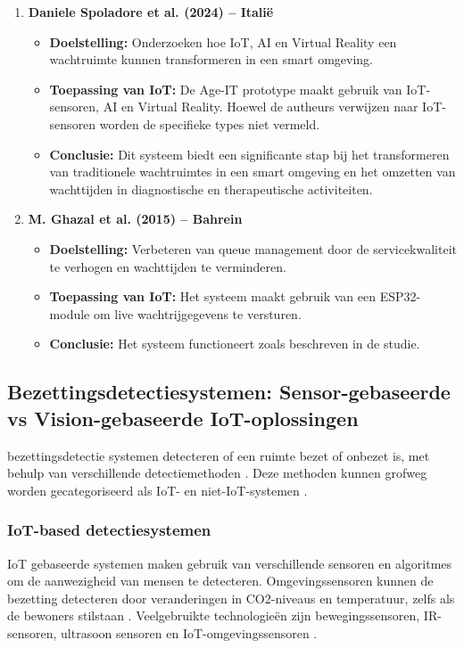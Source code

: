 {\begin{enumerate}
    \item \textbf{Daniele Spoladore et al. (2024) – Italië}
    \begin{itemize}
        \item \textbf{Doelstelling:} Onderzoeken hoe IoT, AI en Virtual Reality een wachtruimte kunnen transformeren in een smart omgeving.
        \item \textbf{Toepassing van IoT:} De Age-IT prototype maakt gebruik van IoT-sensoren, AI en Virtual Reality. Hoewel de autheurs verwijzen naar IoT-sensoren worden de specifieke types niet vermeld.
        \item \textbf{Conclusie:} Dit systeem biedt een significante stap bij het transformeren van traditionele wachtruimtes in een smart omgeving en het omzetten van wachttijden in diagnostische en therapeutische activiteiten.
    \end{itemize}
    
    \item \textbf{M. Ghazal et al. (2015) – Bahrein}
    \begin{itemize}
        \item \textbf{Doelstelling:} Verbeteren van queue management door de servicekwaliteit te verhogen en wachttijden te verminderen.
        \item \textbf{Toepassing van IoT:} Het systeem maakt gebruik van een ESP32-module om live wachtrijgegevens te versturen.
        \item \textbf{Conclusie:} Het systeem functioneert zoals beschreven in de studie.
    \end{itemize}
\end{enumerate}


\subsection{Bezettingsdetectiesystemen: Sensor-gebaseerde vs Vision-gebaseerde IoT-oplossingen}
bezettingsdetectie systemen detecteren of een ruimte bezet of onbezet is, met behulp van verschillende detectiemethoden \autocite{Kleiminger2015}. Deze methoden kunnen grofweg worden gecategoriseerd als IoT- en niet-IoT-systemen \autocite{Chaudhari2024}.

\subsubsection{IoT-based detectiesystemen}
IoT gebaseerde systemen maken gebruik van verschillende sensoren en algoritmes om de aanwezigheid van mensen te detecteren. Omgevingssensoren kunnen de bezetting detecteren door veranderingen in CO2-niveaus en temperatuur, zelfs als de bewoners stilstaan \autocite{Chand2021}. Veelgebruikte technologieën zijn bewegingssensoren, IR-sensoren, ultrasoon sensoren en IoT-omgevingssensoren \autocite{Ji2018, Hammoud2017}.

}
